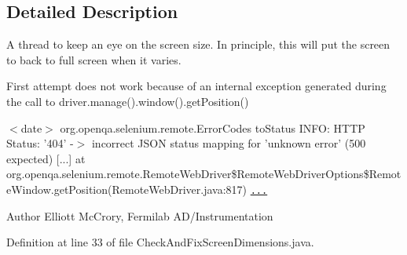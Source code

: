 \subsection{Detailed Description}
A thread to keep an eye on the screen size. In principle, this will put the screen to back to full screen when it varies.

First attempt does not work because of an internal exception generated during the call to driver.\-manage().window().get\-Position()
\begin{DoxyItemize}
\item $<$date$>$ org.\-openqa.\-selenium.\-remote.\-Error\-Codes to\-Status I\-N\-F\-O\-: H\-T\-T\-P Status\-: '404' -\/$>$ incorrect J\-S\-O\-N status mapping for 'unknown error' (500 expected) \mbox{[}...\mbox{]} at org.\-openqa.\-selenium.\-remote.\-Remote\-Web\-Driver\$\-Remote\-Web\-Driver\-Options\$\-Remote\-Window.\-get\-Position(Remote\-Web\-Driver.\-java\-:817) \href{And
Line 817 is not a valid line number in the library, somehow.}{\tt ...}
\end{DoxyItemize}

\begin{DoxyAuthor}{Author}
Elliott Mc\-Crory, Fermilab A\-D/\-Instrumentation 
\end{DoxyAuthor}


Definition at line 33 of file Check\-And\-Fix\-Screen\-Dimensions.\-java.



